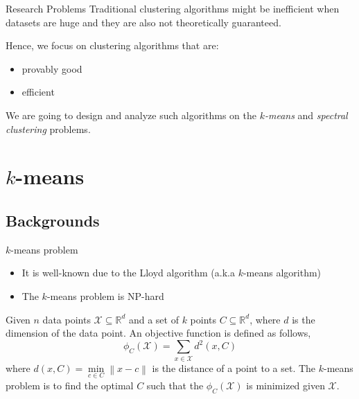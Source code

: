 \documentclass{beamer}
\newcommand{\R}{\mathbb{R}}
\newcommand{\norm}[1]{\left\lVert#1\right\rVert}
\begin{document}
\begin{frame}{Research Problems}
Traditional clustering algorithms might be inefficient when datasets are huge and they are also not theoretically guaranteed.

Hence, we focus on clustering algorithms that are:
\begin{itemize}
	\item provably good
	\item efficient
\end{itemize}

We are going to design and analyze such algorithms on the \textit{$k$-means} and \textit{spectral clustering} problems. 

\end{frame}

\section{$k$-means}

\subsection{Backgrounds}

\begin{frame}{$k$-means problem}

\begin{itemize}
	\item It is well-known due to the Lloyd algorithm \citep{lloyd1982least} (a.k.a $k$-means algorithm)
	\item The $k$-means problem is NP-hard
\end{itemize}
\begin{definition}
	Given $n$ data points $\mathcal{X} \subseteq \R^d$ and a set of $k$ points $C \subseteq \R^d$, where $d$ is the dimension of the data point. An objective function is defined as follows,
	\begin{equation}
		\phi_C(\mathcal{X}) = \sum_{x \in \mathcal{X}}d^2 (x,C)
	\end{equation}
	where $d(x,C) = \min\limits_{c \in C}\norm{x - c}$ is the distance of a point to a set. The $k$-means problem is to find the optimal $C$ such that the $\phi_C(\mathcal{X})$ is minimized given $\mathcal{X}$.
\end{definition}

\end{frame}
\end{document}
